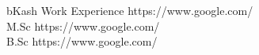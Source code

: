 
\horizontalLineLeft

\certificateItem
    {bKash Work Experience}
    {https://www.google.com/} \\
\certificateItem
    {M.Sc}
    {https://www.google.com/} \\
\certificateItem
    {B.Sc}
    {https://www.google.com/}
